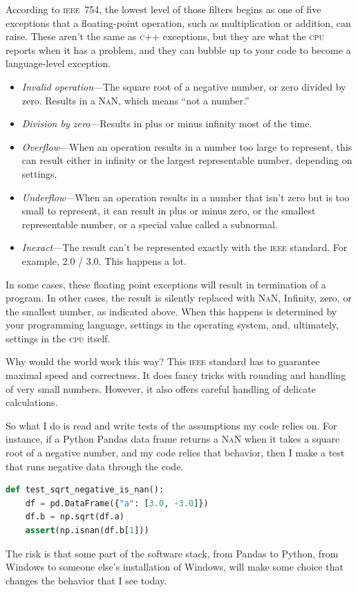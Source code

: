 \documentclass[fleqn,10pt]{olplainarticle}
\newcommand{\cpp}{\textsc{c}++\xspace}
\newcommand{\cpu}{\textsc{cpu}\xspace}
\newcommand{\nan}{\textsc{NaN}\xspace}
\newcommand{\ieee}{\textsc{ieee}\xspace}
\begin{document}
According to \ieee~754, the lowest level of those filters begins
as one of five exceptions that a floating-point
operation, such as multiplication or addition, can raise. These aren't the
same as \cpp exceptions, but they are what the \cpu reports when
it has a problem, and they can bubble up to your code to become a
language-level exception.
\begin{itemize}
    \item \emph{Invalid operation}---The square root of a negative
    number, or zero divided by zero. Results in a \nan, which means
    ``not a number.''
    \item \emph{Division by zero}---Results in plus or minus infinity most
    of the time.
    \item \emph{Overflow}---When an operation results in a number
    too large to represent, this can result either in infinity
    or the largest representable number, depending on settings.
    \item \emph{Underflow}---When an operation results in a number
    that isn't zero but is too small to represent, it can result
    in plus or minus zero, or the smallest representable number,
    or a special value called a subnormal.
    \item \emph{Inexact}---The result can't be represented exactly
    with the \ieee standard. For example, 2.0 / 3.0. This happens a lot.
\end{itemize}
In some cases, these floating point exceptions will result in termination
of a program. In other cases, the result is silently replaced
with \nan, Infinity, zero, or the smallest number, as indicated above.
When this happens is determined by your programming language,
settings in the operating system, and, ultimately, settings
in the \cpu itself.

Why would the world work this way? This \ieee standard has to guarantee
maximal speed and correctness. It does fancy tricks with rounding
and handling of very small numbers. However, it also offers
careful handling of delicate calculations.

So what I do is read \cite{overton2001numerical} and write tests
of the assumptions my code relies on.
For instance, if a Python Pandas data frame returns a \nan when it
takes a square root of a negative number, and my code relies that behavior,
then I make a test that runs negative data through the code.
\begin{lstlisting}[language=Python]
def test_sqrt_negative_is_nan():
    df = pd.DataFrame({"a": [3.0, -3.0]})
    df.b = np.sqrt(df.a)
    assert(np.isnan(df.b[1]))
\end{lstlisting}
The risk is that some part of the software stack, from Pandas to Python, from
Windows to someone else's installation of Windows,
will make some choice that changes the behavior that I see today.
\end{document}
